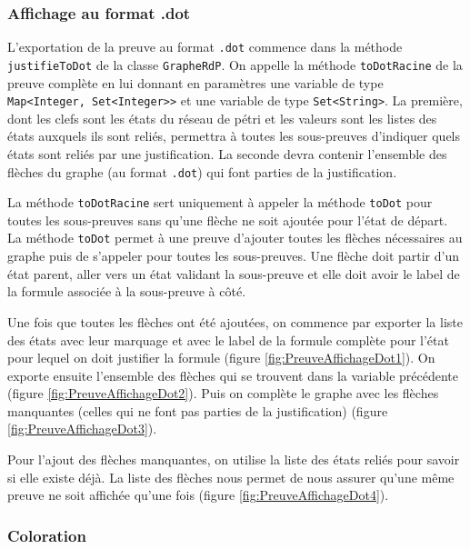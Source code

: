 \documentclass[dvipsnames]{report}
\begin{document}


\subsubsection{Affichage au format .dot}

L'exportation de la preuve au format \texttt{.dot} commence dans la méthode \texttt{justifieToDot} de la classe \texttt{GrapheRdP}. On appelle la méthode \texttt{toDotRacine} de la preuve complète en lui donnant en paramètres une variable de type \texttt{Map<Integer, {Set<Integer>}>} et une variable de type \texttt{Set<String>}. La première, dont les clefs sont les états du réseau de pétri et les valeurs sont les listes des états auxquels ils sont reliés, permettra à toutes les sous-preuves d'indiquer quels états sont reliés par une justification. La seconde devra contenir l'ensemble des flèches du graphe (au format \texttt{.dot}) qui font parties de la justification.

La méthode \texttt{toDotRacine} sert uniquement à appeler la méthode \texttt{toDot} pour toutes les sous-preuves sans qu'une flèche ne soit ajoutée pour l'état de départ. La méthode \texttt{toDot} permet à une preuve d'ajouter toutes les flèches nécessaires au graphe puis de s'appeler pour toutes les sous-preuves. Une flèche doit partir d'un état parent, aller vers un état validant la sous-preuve et elle doit avoir le label de la formule associée à la sous-preuve à côté.

Une fois que toutes les flèches ont été ajoutées, on commence par exporter la liste des états avec leur marquage et avec le label de la formule complète pour l'état pour lequel on doit justifier la formule (figure \ref{fig:PreuveAffichageDot1}). On exporte ensuite l'ensemble des flèches qui se trouvent dans la variable précédente (figure \ref{fig:PreuveAffichageDot2}). Puis on complète le graphe avec les flèches manquantes (celles qui ne font pas parties de la justification) (figure \ref{fig:PreuveAffichageDot3}).



Pour l'ajout des flèches manquantes, on utilise la liste des états reliés pour savoir si elle existe déjà. La liste des flèches nous permet de nous assurer qu'une même preuve ne soit affichée qu'une fois (figure \ref{fig:PreuveAffichageDot4}).



\subsubsection{Coloration}
\end{document}
